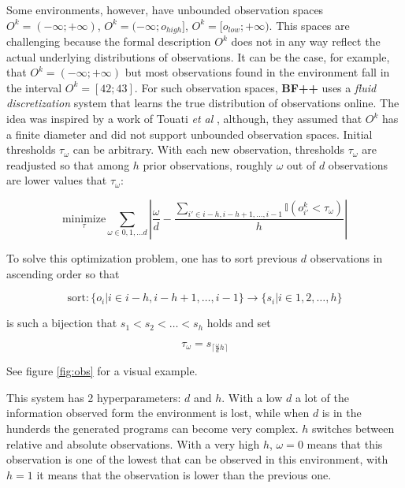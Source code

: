 Some environments, however, have unbounded observation spaces $O^k=(-\infty;+\infty)$, $O^k=(-\infty;o_{high}]$,  $O^k=[o_{low};+\infty)$.
This spaces are challenging because the formal description $O^k$ does not in any way reflect the actual underlying distributions of observations.
It can be the case, for example, that $O^k=(-\infty;+\infty)$ but most observations found in the environment fall in the interval $O^k=[42;43]$.
For such observation spaces, \textbf{BF++} uses a \textit{fluid discretization} system that learns the true distribution of observations online. The idea was inspired by a work of Touati {\sl et al} \cite{adaptivediscretization}, although, they assumed that $O^k$ has a finite diameter and did not support unbounded observation spaces.
Initial thresholds $\tau_\omega$ can be arbitrary.
With each new observation, thresholds $\tau_\omega$ are readjusted so that among $h$ prior observations, roughly $\omega$ out of $d$  observations are lower values that $\tau_\omega$:

\begin{equation}
\underset{\tau}{\text{minimize}} \sum_{\omega \in 0,1,\dots d} |\frac{\omega}{d} - \frac{\sum_{i' \in i-h,i-h+1,\dots,i-1} \mathbb{I}(o_{i'}^k < \tau_\omega)}{h}|
\end{equation}

To solve this optimization problem, one has to sort previous $d$ observations in ascending order so that 

\begin{equation}
    \text{sort}: \{o_i | i \in i-h,i-h+1,\dots,i-1\} \longrightarrow \{ s_i | i \in 1,2,\dots,h \}
\end{equation}

is such a bijection that $s_1 < s_2 < \dots < s_h$ holds and set

\begin{equation}
    \tau_{\omega} = s_{\lceil \frac{\omega}{d} h \rceil}
\end{equation}

See figure \ref{fig:obs} for a visual example.


This system has 2 hyperparameters: $d$ and $h$.
With a low $d$ a lot of the information observed form the environment is lost, while when $d$ is in the hunderds the generated programs can become very complex.
$h$ switches between relative and absolute observations.
With a very high $h$, $\omega=0$ means that this observation is one of the lowest that can be observed in this environment, with $h=1$ it means that the observation is lower than the previous one.

